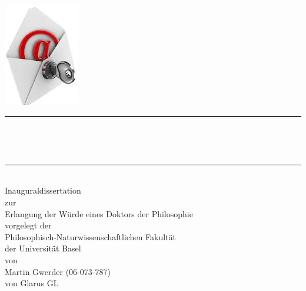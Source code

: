 \begin{titlepage}
\pagecolor{orange}\afterpage{\nopagecolor}
\begin{center}
\includegraphics[height=0.4\textwidth]{./inc/logo.jpg}~\\[1cm]

\newcommand{\HRule}{\rule{\linewidth}{0.5mm}}
\HRule \\[0.4cm]
{ \huge \bfseries \makeatletter\@title\par\normalsize\@subtitle\makeatother \\[0.4cm] }

\HRule \\[1.5cm]

{\large Inauguraldissertation}\\
zur\\
Erlangung der W\"urde eines Doktors der Philosophie\\
vorgelegt der\\
Philosophisch-Naturwissenschaftlichen Fakult\"at\\
der Universit\"at Basel\\
von\\
Martin Gwerder (06-073-787)\\
von Glarus GL\\

\end{center}
\end{titlepage}
